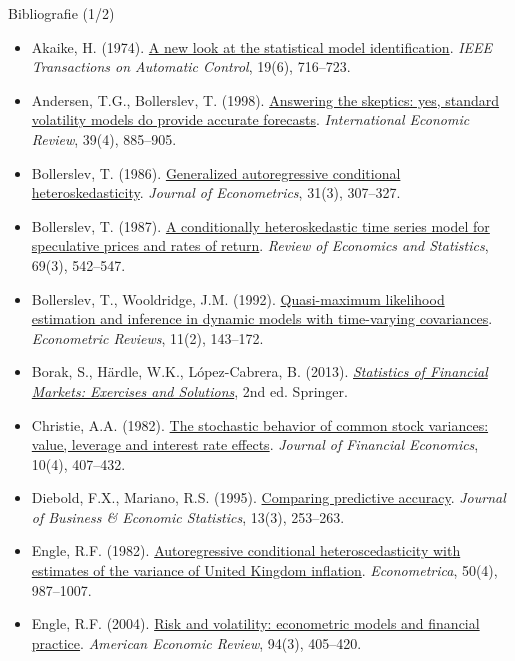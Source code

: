 \begin{frame}{Bibliografie (1/2)}
\itemsize{\tiny}
\begin{itemize}
    \item Akaike, H. (1974). \href{https://doi.org/10.1109/TAC.1974.1100705}{A new look at the statistical model identification}. \textit{IEEE Transactions on Automatic Control}, 19(6), 716--723.
    \item Andersen, T.G., Bollerslev, T. (1998). \href{https://doi.org/10.2307/2527343}{Answering the skeptics: yes, standard volatility models do provide accurate forecasts}. \textit{International Economic Review}, 39(4), 885--905.
    \item Bollerslev, T. (1986). \href{https://doi.org/10.1016/0304-4076(86)90063-1}{Generalized autoregressive conditional heteroskedasticity}. \textit{Journal of Econometrics}, 31(3), 307--327.
    \item Bollerslev, T. (1987). \href{https://doi.org/10.2307/1925546}{A conditionally heteroskedastic time series model for speculative prices and rates of return}. \textit{Review of Economics and Statistics}, 69(3), 542--547.
    \item Bollerslev, T., Wooldridge, J.M. (1992). \href{https://doi.org/10.1080/07474939208800229}{Quasi-maximum likelihood estimation and inference in dynamic models with time-varying covariances}. \textit{Econometric Reviews}, 11(2), 143--172.
    \item Borak, S., Härdle, W.K., López-Cabrera, B. (2013). \href{https://doi.org/10.1007/978-3-642-33929-5}{\textit{Statistics of Financial Markets: Exercises and Solutions}}, 2nd ed. Springer.
    \item Christie, A.A. (1982). \href{https://doi.org/10.1016/0304-405X(82)90018-6}{The stochastic behavior of common stock variances: value, leverage and interest rate effects}. \textit{Journal of Financial Economics}, 10(4), 407--432.
    \item Diebold, F.X., Mariano, R.S. (1995). \href{https://doi.org/10.1080/07350015.1995.10524599}{Comparing predictive accuracy}. \textit{Journal of Business \& Economic Statistics}, 13(3), 253--263.
    \item Engle, R.F. (1982). \href{https://doi.org/10.2307/1912773}{Autoregressive conditional heteroscedasticity with estimates of the variance of United Kingdom inflation}. \textit{Econometrica}, 50(4), 987--1007.
    \item Engle, R.F. (2004). \href{https://doi.org/10.1257/0002828041464597}{Risk and volatility: econometric models and financial practice}. \textit{American Economic Review}, 94(3), 405--420.

\end{itemize}
\end{frame}
